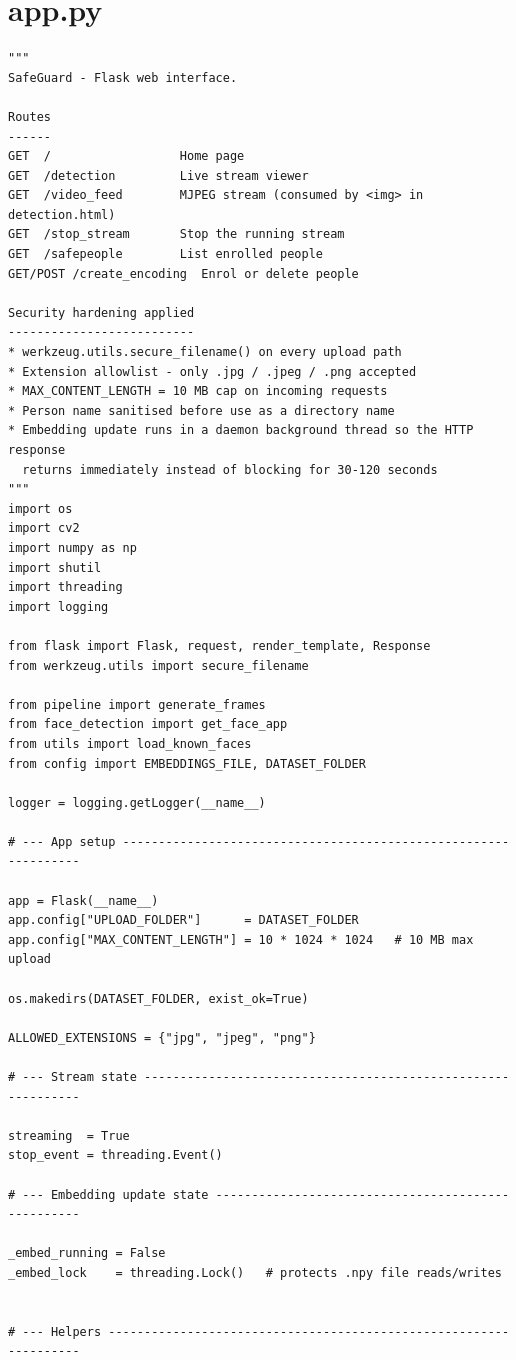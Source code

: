 \documentclass[12pt,a4paper]{report}
\begin{document}
\section{app.py}
\begin{lstlisting}
"""
SafeGuard - Flask web interface.

Routes
------
GET  /                  Home page
GET  /detection         Live stream viewer
GET  /video_feed        MJPEG stream (consumed by <img> in detection.html)
GET  /stop_stream       Stop the running stream
GET  /safepeople        List enrolled people
GET/POST /create_encoding  Enrol or delete people

Security hardening applied
--------------------------
* werkzeug.utils.secure_filename() on every upload path
* Extension allowlist - only .jpg / .jpeg / .png accepted
* MAX_CONTENT_LENGTH = 10 MB cap on incoming requests
* Person name sanitised before use as a directory name
* Embedding update runs in a daemon background thread so the HTTP response
  returns immediately instead of blocking for 30-120 seconds
"""
import os
import cv2
import numpy as np
import shutil
import threading
import logging

from flask import Flask, request, render_template, Response
from werkzeug.utils import secure_filename

from pipeline import generate_frames
from face_detection import get_face_app
from utils import load_known_faces
from config import EMBEDDINGS_FILE, DATASET_FOLDER

logger = logging.getLogger(__name__)

# --- App setup ----------------------------------------------------------------

app = Flask(__name__)
app.config["UPLOAD_FOLDER"]      = DATASET_FOLDER
app.config["MAX_CONTENT_LENGTH"] = 10 * 1024 * 1024   # 10 MB max upload

os.makedirs(DATASET_FOLDER, exist_ok=True)

ALLOWED_EXTENSIONS = {"jpg", "jpeg", "png"}

# --- Stream state -------------------------------------------------------------

streaming  = True
stop_event = threading.Event()

# --- Embedding update state ---------------------------------------------------

_embed_running = False
_embed_lock    = threading.Lock()   # protects .npy file reads/writes


# --- Helpers ------------------------------------------------------------------


\end{lstlisting}
\end{document}
